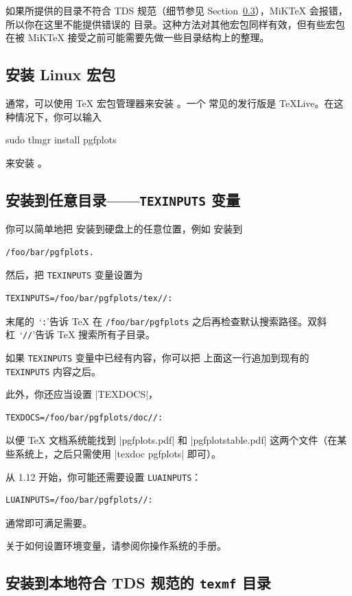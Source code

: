 如果所提供的目录不符合 TDS 规范（细节参见
Section~\ref{pgfplots:tds}），MiK\TeX{} 会报错，所以你在这里不能提供错误的
目录。这种方法对其他宏包同样有效，但有些宏包在被 MiK\TeX{}
接受之前可能需要先做一些目录结构上的整理。


\subsection{安装 Linux 宏包}

通常，可以使用 \TeX{} 宏包管理器来安装 \PGFPlots{}。一个
常见的发行版是 \TeX{}Live。在这种情况下，你可以输入
%
\begin{codeexample}
sudo tlmgr install pgfplots
\end{codeexample}
%
\noindent 来安装 \PGFPlots{}。


\subsection{安装到任意目录——\texttt{TEXINPUTS} 变量}

你可以简单地把 \PGFPlots{} 安装到硬盘上的任意位置，例如
安装到
%
\begin{verbatim}
/foo/bar/pgfplots.
\end{verbatim}
%
然后，把 \texttt{TEXINPUTS} 变量设置为
%
\begin{verbatim}
TEXINPUTS=/foo/bar/pgfplots/tex//:
\end{verbatim}
%
末尾的~`\texttt{:}'告诉 \TeX{} 在 \lstinline!/foo/bar/pgfplots!
之后再检查默认搜索路径。双斜杠~`\texttt{//}'告诉 \TeX{}
搜索所有子目录。

如果 \texttt{TEXINPUTS} 变量中已经有内容，你可以把
上面这一行追加到现有的 \texttt{TEXINPUTS} 内容之后。

此外，你还应当设置 |TEXDOCS|，
%
\begin{verbatim}
TEXDOCS=/foo/bar/pgfplots/doc//:
\end{verbatim}
%
以便 \TeX{} 文档系统能找到 |pgfplots.pdf| 和
|pgfplotstable.pdf| 这两个文件（在某些系统上，之后只需使用
|texdoc pgfplots| 即可）。

从 \PGFPlots{} 1.12 开始，你可能还需要设置 \texttt{LUAINPUTS}：
%
\begin{verbatim}
LUAINPUTS=/foo/bar/pgfplots//:
\end{verbatim}
%
通常即可满足需要。

关于如何设置环境变量，请参阅你操作系统的手册。


\subsection{安装到本地符合 TDS 规范的 \texttt{texmf} 目录}
\label{pgfplots:tds}


